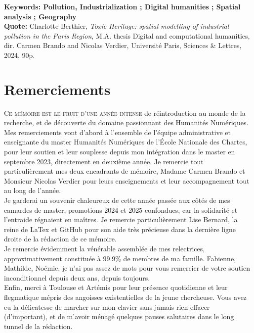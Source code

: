 \documentclass[a4paper,twoside,12pt]{book}
\begin{document}
\medskip

\textbf{Keywords: Pollution, Industrialization ; Digital humanities ; Spatial analysis ; Geography} \\

\textbf{Quote:} Charlotte Berthier, \textit{Toxic Heritage: spatial modelling of industrial pollution in the Paris Region}, M.A. thesis \og Digital and computational humanities\fg{}, dir. Carmen Brando and Nicolas Verdier, Université Paris, Sciences \& Lettres, 2024, 90p.


\clearpage
\thispagestyle{empty}
\cleardoublepage


\section*{Remerciements}

\lettrine{C}{e mémoire est le fruit d'une année intense} de réintroduction au monde de la recherche, et de découverte du domaine passionnant des Humanités Numériques. Mes remerciements vont d'abord à l'ensemble de l'équipe administrative et enseignante du master Humanités Numériques de l'École Nationale des Chartes, pour leur soutien et leur souplesse depuis mon intégration dans le master en septembre 2023, directement en deuxième année. Je remercie tout particulièrement mes deux encadrants de mémoire, Madame Carmen Brando et Monsieur Nicolas Verdier pour leurs enseignements et leur accompagnement tout au long de l'année.  \\

Je garderai un souvenir chaleureux de cette année passée aux côtés de mes camardes de master, promotions 2024 et 2025 confondues, car la solidarité et l'entraide régnaient en maîtres. Je remercie particulièrement Lise Bernard, la reine de LaTex et GitHub pour son aide très précieuse dans la dernière ligne droite de la rédaction de ce mémoire. \\

Je remercie évidemment la vénérable assemblée de mes relectrices, approximativement constituée à 99.9\% de membres de ma famille. Fabienne, Mathilde, Noémie, je n'ai pas assez de mots pour vous remercier de votre soutien inconditionnel depuis deux ans, depuis toujours. \\

Enfin, merci à Toulouse et Artémis pour leur présence quotidienne et leur flegmatique mépris des angoisses existentielles de la jeune chercheuse. Vous avez eu la délicatesse de marcher sur mon clavier sans jamais rien effacer (d'important), et de m'avoir ménagé quelques pauses salutaires dans le long tunnel de la rédaction. 
\end{document}
